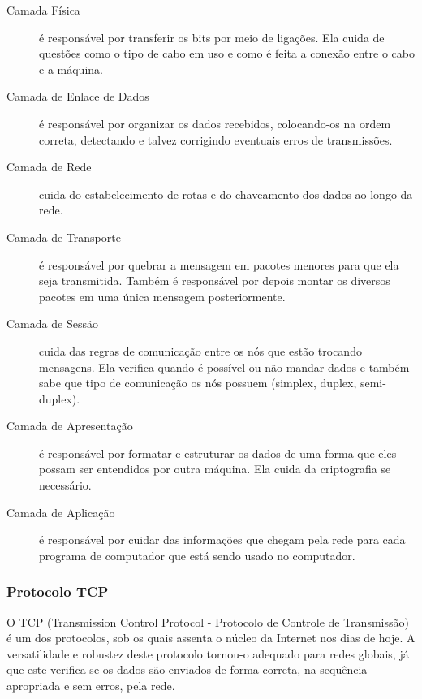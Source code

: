 			\begin{description}
				\item[Camada Física] é responsável por transferir os bits por meio de ligações. Ela cuida de questões como o tipo de cabo em uso e como é feita a conexão entre o cabo e a máquina.
				
				\item[Camada de Enlace de Dados] é responsável por organizar os dados recebidos, colocando-os na ordem correta, detectando e talvez corrigindo eventuais erros de transmissões.
				
				\item[Camada de Rede] cuida do estabelecimento de rotas e do chaveamento dos dados ao longo da rede.
				
				\item[Camada de Transporte] é responsável por quebrar a mensagem em pacotes menores para que ela seja transmitida. Também é responsável por depois montar os diversos pacotes em uma única mensagem posteriormente.
				
				\item[Camada de Sessão] cuida das regras de comunicação entre os nós que estão trocando mensagens. Ela verifica quando é possível ou não mandar dados e também sabe que tipo de comunicação os nós possuem (simplex, duplex, semi-duplex).
				
				\item[Camada de Apresentação] é responsável por formatar e estruturar os dados de uma forma que eles possam ser entendidos por outra máquina. Ela cuida da criptografia se necessário.
				
				\item[Camada de Aplicação] é responsável por cuidar das informações que chegam pela rede para cada programa de computador que está sendo usado no computador.
			\end{description}
		
		\subsubsection{Protocolo TCP}
			O TCP (Transmission Control Protocol - Protocolo de Controle de Transmissão) é um dos protocolos, sob os quais assenta o núcleo da Internet nos dias de hoje. A versatilidade e robustez deste protocolo tornou-o adequado para redes globais, já que este verifica se os dados são enviados de forma correta, na sequência apropriada e sem erros, pela rede.


